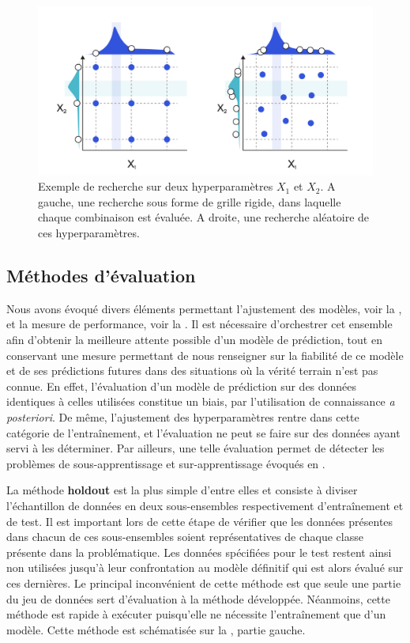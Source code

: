 \begin{figure}[H]
    \centering
    \includegraphics[width=\linewidth]{contents/chapter_3/resources/example_hyperparameter_selection.pdf}
    \caption{Exemple de recherche sur deux hyperparamètres $X_1$ et $X_2$. A gauche, une recherche sous forme de grille rigide, dans laquelle chaque combinaison est évaluée. A droite, une recherche aléatoire de ces hyperparamètres.}
    \label{fig:example_hyperparameter_selection}
\end{figure}

\subsection{Méthodes d'évaluation}
Nous avons évoqué divers éléments permettant l'ajustement des modèles, voir la , et la mesure de performance, voir la . Il est nécessaire d'orchestrer cet ensemble afin d'obtenir la meilleure attente possible d'un modèle de prédiction, tout en conservant une mesure permettant de nous renseigner sur la fiabilité de ce modèle et de ses prédictions futures dans des situations où la vérité terrain n'est pas connue. En effet, l'évaluation d'un modèle de prédiction sur des données identiques à celles utilisées constitue un biais, par l'utilisation de connaissance \textit{a posteriori}. De même, l'ajustement des hyperparamètres rentre dans cette catégorie de l'entraînement, et l'évaluation ne peut se faire sur des données ayant servi à les déterminer. Par ailleurs, une telle évaluation permet de détecter les problèmes de sous-apprentissage et sur-apprentissage évoqués en .\par

La méthode \textbf{holdout} est la plus simple d'entre elles et consiste à diviser l’échantillon de données en deux sous-ensembles respectivement d'entraînement et de test. Il est important lors de cette étape de vérifier que les données présentes dans chacun de ces sous-ensembles soient représentatives de chaque classe présente dans la problématique. Les données spécifiées pour le test restent ainsi non utilisées jusqu'à leur confrontation au modèle définitif qui est alors évalué sur ces dernières. Le principal inconvénient de cette méthode est que seule une partie du jeu de données sert d'évaluation à la méthode développée. Néanmoins, cette méthode est rapide à exécuter puisqu'elle ne nécessite l'entraînement que d'un modèle. Cette méthode est schématisée sur la , partie gauche.\par

